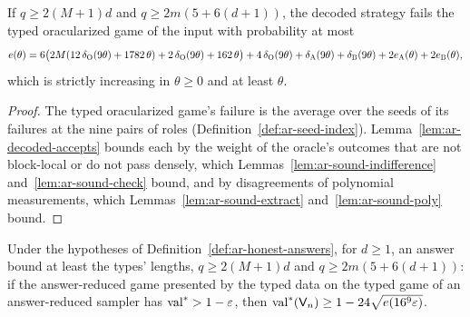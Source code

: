 \begin{lemma}
\label{lem:ar-decoded-value}
\leanok
If $q \geq 2 (M + 1) d$ and $q \geq 2 m (5 + 6 (d + 1))$, the decoded strategy fails the typed
oracularized game of the input with probability at most
\[
e(\theta) = 6 \bigl(2M (12\, \delta_{\textsc{O}}(9\theta) + 1782\, \theta) + 2\,
\delta_{\textsc{O}}(9\theta) + 162\, \theta\bigr) + 4\, \delta_{\textsc{O}}(9\theta) +
\delta_{\textsc{A}}(9\theta) + \delta_{\textsc{B}}(9\theta) + 2 e_{\textsc{A}}(\theta) + 2 e_{\textsc{B}}(\theta),
\]
which is strictly increasing in $\theta \geq 0$ and at least $\theta$.
\end{lemma}

\begin{proof}
\leanok
The typed oracularized game's failure is the average over the seeds of its failures at the nine
pairs of roles (Definition~\ref{def:ar-seed-index}). Lemma~\ref{lem:ar-decoded-accepts} bounds each
by the weight of the oracle's outcomes that are not block-local or do not pass densely, which
Lemmas~\ref{lem:ar-sound-indifference} and~\ref{lem:ar-sound-check} bound, and by disagreements of
polynomial measurements, which Lemmas~\ref{lem:ar-sound-extract} and~\ref{lem:ar-sound-poly}
bound.
\end{proof}

\begin{theorem}
\label{thm:ar-sound}
\leanok
Under the hypotheses of Definition~\ref{def:ar-honest-answers}, for $d \geq 1$, an answer bound at
least the types' lengths, $q \geq 2 (M + 1) d$ and $q \geq 2 m (5 + 6 (d + 1))$: if the
answer-reduced game presented by the typed data on the typed game of an answer-reduced sampler has
$\mathrm{val}^* > 1 - \varepsilon$, then $\mathrm{val}^*(\mathsf{V}_n) \geq 1 - 24 \sqrt{e(16^9 \varepsilon)}$.
\end{theorem}

